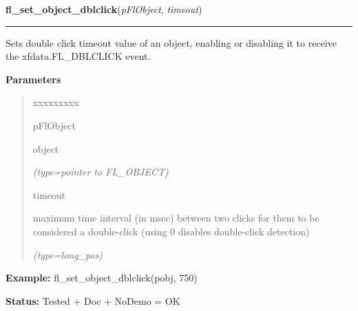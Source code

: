 \hspace{.8\funcindent}\begin{boxedminipage}{\funcwidth}

    \raggedright \textbf{fl\_set\_object\_dblclick}(\textit{pFlObject}, \textit{timeout})

    \vspace{-1.5ex}

    \rule{\textwidth}{0.5\fboxrule}
\setlength{\parskip}{2ex}
    Sets double click timeout value of an object, enabling or disabling it 
    to receive the xfdata.FL\_DBLCLICK event.

\setlength{\parskip}{1ex}
      \textbf{Parameters}
      \vspace{-1ex}

      \begin{quote}
        \begin{Ventry}{xxxxxxxxx}

          \item[pFlObject]

          object

            {\it (type=pointer to FL\_OBJECT)}

          \item[timeout]

          maximum time interval (in msec) between two clicks for them to be
          considered a double-click (using 0 disables double-click 
          detection)

            {\it (type=long\_pos)}

        \end{Ventry}

      \end{quote}

\textbf{Example:} fl\_set\_object\_dblclick(pobj, 750)



\textbf{Status:} Tested + Doc + NoDemo = OK



    \end{boxedminipage}

    \label{xformslib:flbasic:fl_get_object_dblclick}

    \vspace{0.5ex}

